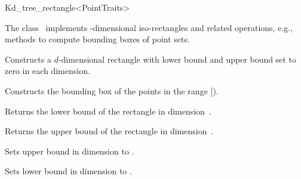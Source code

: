 

\begin{ccRefClass}{Kd_tree_rectangle<PointTraits>}  %

\begin{ccAdvanced}


\ccDefinition
  
The class \ccRefName\ implements -dimensional iso-rectangles and related operations,
e.g., methods to compute bounding boxes of point sets. 




\ccTypes


\ccCreation
{}  %

{Constructs a $d$-dimensional rectangle  with lower bound and upper bound set to zero 
in each dimension.}
 
{Constructs the bounding box of the points in the range [).}

\ccOperations

{Returns the lower bound of the rectangle in dimension~.}

{Returns the upper bound of the rectangle in dimension~.}



{Sets upper bound in dimension  to .}

{Sets lower bound in dimension  to .}
 

\end{ccAdvanced}
\end{ccRefClass}
